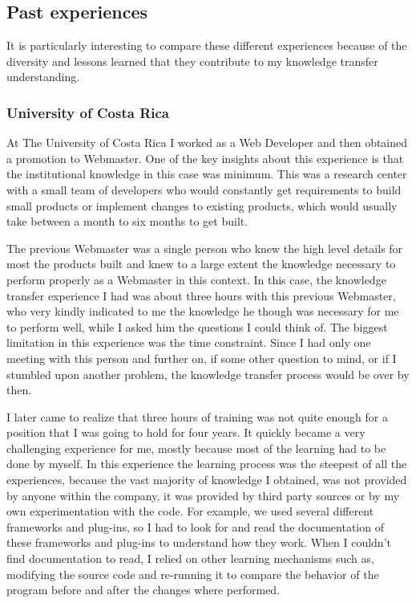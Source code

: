 \documentclass[12pt, letterpaper]{article}
\begin{document}
\subsection{Past experiences}
It is particularly interesting to compare these different experiences because of the diversity and lessons learned
that they contribute to my knowledge transfer understanding.

\subsubsection{University of Costa Rica}
At The University of Costa Rica I worked as a Web Developer and then obtained a promotion to Webmaster. 
One of the key insights about this experience is that the institutional knowledge 
in this case was minimum.
This was a research center with a small team of developers who would constantly get requirements to build small products 
or implement changes to existing products, which would usually take between a month to six months to get built.

The previous Webmaster was a single person who knew the high level details for most the products built and knew to a 
large extent the knowledge necessary to perform properly as a Webmaster in this context.
In this case, the knowledge transfer experience I had was about three hours with this previous Webmaster, who very kindly
indicated to me the knowledge he though was necessary for me to perform well, while I asked him the questions I could 
think of. The biggest limitation in this experience was the time constraint. Since I had only one meeting with 
this person and further on, if some other question to mind, or if I stumbled upon another problem, the knowledge
transfer process would be over by then.

I later came to realize that three hours of training was not quite enough for a position that I was going to hold for four
years. It quickly became a very challenging experience for me, mostly because most of the learning had to be done 
by myself. In this experience the learning process was the steepest of all the experiences, because the vast 
majority of knowledge I obtained, was not provided by anyone within the company, it was provided by third party
sources or by my own experimentation with the code. For example, we used several different frameworks and plug-ins, so I had to look for and read the documentation of 
these frameworks and plug-ins to understand how they work. When I couldn't find documentation to read, I relied
on other learning mechanisms such as, modifying the source code and re-running it to compare the behavior of the program
before and after the changes where performed. 
\end{document}
